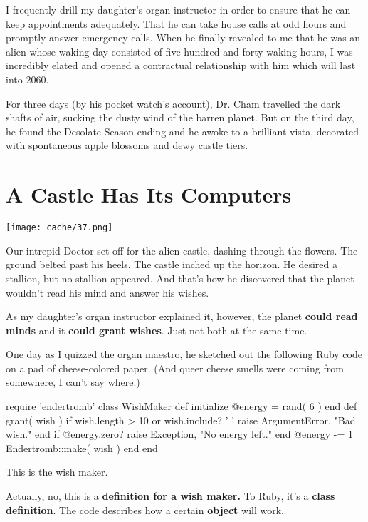 \documentclass[12pt,twoside]{report}
\begin{document}
I frequently drill my daughter's organ instructor in order to ensure
that he can keep appointments adequately.  That he can take house
calls at odd hours and promptly answer emergency calls. When he
finally revealed to me that he was an alien whose waking day consisted
of five-hundred and forty waking hours, I was incredibly elated and
opened a contractual relationship with him which will last into 2060.

For three days (by his pocket watch's account), Dr. Cham travelled the
dark shafts of air, sucking the dusty wind of the barren planet. But
on the third day, he found the Desolate Season ending and he awoke to
a brilliant vista, decorated with spontaneous apple blossoms and dewy
castle tiers.


\section{A Castle Has Its Computers}


	\texttt{[image: cache/37.png]}

Our intrepid Doctor set off for the alien castle, dashing through the
flowers.  The ground belted past his heels.  The castle inched up the
horizon.  He desired a stallion, but no stallion appeared.  And that's
how he discovered that the planet wouldn't read his mind and answer
his wishes.

As my daughter's organ instructor explained it, however, the planet
{\bf could read minds} and it {\bf could grant wishes}.  Just not both
at the same time.

One day as I quizzed the organ maestro, he sketched out the following
Ruby code on a pad of cheese-colored paper.  (And queer cheese smells
were coming from somewhere, I can't say where.)


\begin{rubycode}

 require 'endertromb'
 class WishMaker
   def initialize
     @energy = rand( 6 )
   end
   def grant( wish )
     if wish.length > 10 or wish.include? ' '
       raise ArgumentError, "Bad wish."
     end
     if @energy.zero?
       raise Exception, "No energy left."
     end
     @energy -= 1
     Endertromb::make( wish )
   end
 end

\end{rubycode}


This is the wish maker.

Actually, no, this is a {\bf definition for a wish maker.}  To Ruby,
it's a {\bf class definition}. The code describes how a certain {\bf
  object} will work.
\end{document}
